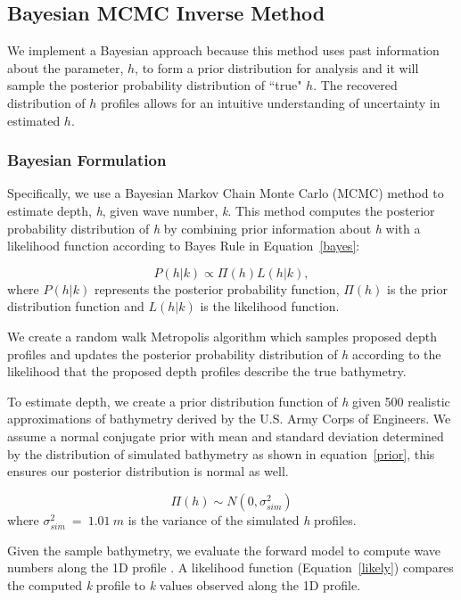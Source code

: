 \subsection{Bayesian MCMC Inverse Method}
We implement a Bayesian approach because this method uses past information about the parameter, $h$, to form a prior distribution for analysis and it will sample the posterior probability distribution of ``true" $h$. The recovered distribution of $h$ profiles allows for an intuitive understanding of uncertainty in estimated $h$.

\subsubsection{Bayesian Formulation}

Specifically, we use a Bayesian Markov Chain Monte Carlo (MCMC) method to estimate depth, \textit{h}, given wave number, \textit{k}. %
This method computes the posterior probability distribution of \textit{h} by combining prior information about \textit{h} with a likelihood function according to Bayes Rule in Equation~\ref{bayes}: 


\begin{equation}\label{bayes}
P(h|%
k) \propto \Pi(h)L(h|%
k),
\end{equation} 
where $P(h|%
k)$ represents the posterior probability function, $\Pi(h)$ is the prior distribution function and $L(h|%
k)$ is the likelihood function.

We create a random walk Metropolis algorithm \citep{Metropolis1953} which samples proposed depth profiles and updates the posterior probability distribution of \textit{h} according to the likelihood that the proposed depth profiles describe the true bathymetry. 

To estimate depth, we create a prior distribution function of \textit{h} given 500 realistic approximations of bathymetry derived by the U.S. Army Corps of Engineers.  We assume a normal conjugate prior with mean and standard deviation determined by the distribution of simulated bathymetry as shown in equation~\ref{prior}, this ensures our posterior distribution is normal as well. 

\begin{equation}\label{prior}
\Pi(h) \sim N(0,\sigma_{sim}^2)
\end{equation}
where $\sigma_{sim}^2~=~1.01~m$ is the variance of the simulated \textit{h} profiles. 

Given the sample bathymetry, we evaluate the forward model to compute wave numbers along the 1D profile%
. A likelihood function (Equation~\ref{likely}) compares the computed \textit{k} profile to \textit{k} values observed along the 1D profile. 

